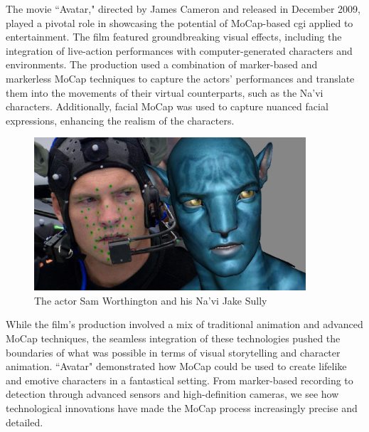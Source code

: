 The movie “Avatar," directed by James Cameron and released in December 2009, 
played a pivotal role in showcasing the potential of MoCap-based cgi applied to entertainment. 
The film featured groundbreaking visual effects, 
including the integration of live-action performances with computer-generated characters and environments. 
The production used a combination of marker-based and markerless MoCap techniques to capture the actors' 
performances and translate them into the movements of their virtual counterparts, such as the Na'vi characters.
Additionally, facial MoCap was used to capture nuanced facial expressions, enhancing the realism of the characters.
\begin{figure}[H]
    \centering
    \includegraphics[width=0.9\textwidth]{graphics/avatar_markers.jpg}
    \caption[]{The actor Sam Worthington and his Na'vi Jake Sully}
    \label{fig:avatar}
\end{figure}

While the film's production involved a mix of traditional animation and advanced MoCap techniques, 
the seamless integration of these technologies pushed the boundaries of what was possible in terms of visual storytelling 
and character animation. 
“Avatar" demonstrated how MoCap could be used to create lifelike and emotive characters in a fantastical setting.
From marker-based recording to detection through advanced sensors and high-definition cameras, we see how technological innovations have made the MoCap process increasingly precise and detailed.
